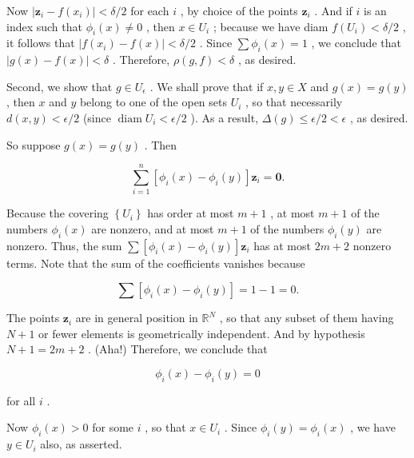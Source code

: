 Now \(\left| {{\mathbf{z}}_{i} - f\left( {x}_{i}\right) }\right|  < \delta /2\) for each \(i\) , by choice of the points \({\mathbf{z}}_{i}\) . And if \(i\) is an index such that \({\phi }_{i}\left( x\right)  \neq  0\) , then \(x \in  {U}_{i}\) ; because we have diam \(f\left( {U}_{i}\right)  < \delta /2\) , it follows that \(\left| {f\left( {x}_{i}\right)  - f\left( x\right) }\right|  < \delta /2\) . Since \(\sum {\phi }_{i}\left( x\right)  = 1\) , we conclude that \(\left| {g\left( x\right)  - f\left( x\right) }\right|  < \delta\) . Therefore, \(\rho \left( {g,f}\right)  < \delta\) , as desired.

Second, we show that \(g \in  {U}_{\epsilon }\) . We shall prove that if \(x,y \in  X\) and \(g\left( x\right)  = g\left( y\right)\) , then \(x\) and \(y\) belong to one of the open sets \({U}_{i}\) , so that necessarily \(d\left( {x,y}\right)  < \epsilon /2\) (since \(\operatorname{diam}{U}_{i} < \epsilon /2\) ). As a result, \(\Delta \left( g\right)  \leq  \epsilon /2 < \epsilon\) , as desired.

So suppose \(g\left( x\right)  = g\left( y\right)\) . Then

\[
\mathop{\sum }\limits_{{i = 1}}^{n}\left\lbrack  {{\phi }_{i}\left( x\right)  - {\phi }_{i}\left( y\right) }\right\rbrack  {\mathbf{z}}_{i} = \mathbf{0}.
\]

Because the covering \(\left\{  {U}_{i}\right\}\) has order at most \(m + 1\) , at most \(m + 1\) of the numbers \({\phi }_{i}\left( x\right)\) are nonzero, and at most \(m + 1\) of the numbers \({\phi }_{i}\left( y\right)\) are nonzero. Thus, the sum \(\sum \left\lbrack  {{\phi }_{i}\left( x\right)  - {\phi }_{i}\left( y\right) }\right\rbrack  {\mathbf{z}}_{i}\) has at most \({2m} + 2\) nonzero terms. Note that the sum of the coefficients vanishes because

\[
\sum \left\lbrack  {{\phi }_{i}\left( x\right)  - {\phi }_{i}\left( y\right) }\right\rbrack   = 1 - 1 = 0.
\]

The points \({\mathbf{z}}_{i}\) are in general position in \({\mathbb{R}}^{N}\) , so that any subset of them having \(N + 1\) or fewer elements is geometrically independent. And by hypothesis \(N + 1 = {2m} + 2\) . (Aha!) Therefore, we conclude that

\[
{\phi }_{i}\left( x\right)  - {\phi }_{i}\left( y\right)  = 0
\]

for all \(i\) .

Now \({\phi }_{i}\left( x\right)  > 0\) for some \(i\) , so that \(x \in  {U}_{i}\) . Since \({\phi }_{i}\left( y\right)  = {\phi }_{i}\left( x\right)\) , we have \(y \in  {U}_{i}\) also, as asserted.

